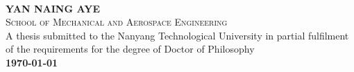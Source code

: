 \begin{titlepage}

\begin{center}
{\Large  \bfseries \titleSentence}\\[4cm]

{\Large \bfseries YAN NAING AYE}\\[3cm]
\vfill
\textsc{\large 
	School of Mechanical and Aerospace Engineering}\\[1cm]

{\Large \sffamily A thesis submitted to the Nanyang Technological University in partial fulfilment of the requirements for the degree of Doctor of Philosophy}\\[1cm]


{\Large \bfseries \mydate\today}

\end{center}
\end{titlepage}